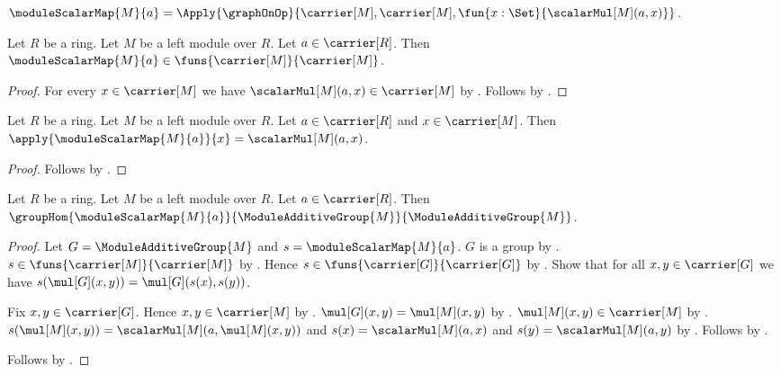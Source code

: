 \begin{definition}\label{module_scalar_map}
    $\moduleScalarMap{M}{a}
        =\Apply{\graphOnOp}{
            \carrier[M],\carrier[M],
            \fun{x:\Set}{\scalarMul[M](a,x)}}$.
\end{definition}

\begin{proposition}\label{module_scalar_map_type}
    Let $R$ be a ring.
    Let $M$ be a left module over $R$.
    Let $a\in\carrier[R]$.
    Then $\moduleScalarMap{M}{a}\in
        \funs{\carrier[M]}{\carrier[M]}$.
\end{proposition}
\begin{proof}
    For every $x\in\carrier[M]$ we have
        $\scalarMul[M](a,x)\in\carrier[M]$ by
        .
    Follows by .
\end{proof}

\begin{proposition}\label{module_scalar_map_apply}
    Let $R$ be a ring.
    Let $M$ be a left module over $R$.
    Let $a\in\carrier[R]$ and $x\in\carrier[M]$.
    Then $\apply{\moduleScalarMap{M}{a}}{x}=\scalarMul[M](a,x)$.
\end{proposition}
\begin{proof}
    Follows by .
\end{proof}

\begin{theorem}\label{module_scalar_map_group_hom}
    Let $R$ be a ring.
    Let $M$ be a left module over $R$.
    Let $a\in\carrier[R]$.
    Then $\groupHom{\moduleScalarMap{M}{a}}{
        \ModuleAdditiveGroup{M}}{\ModuleAdditiveGroup{M}}$.
\end{theorem}
\begin{proof}
    Let $G=\ModuleAdditiveGroup{M}$ and $s=\moduleScalarMap{M}{a}$.
    $G$ is a group by .
    $s\in\funs{\carrier[M]}{\carrier[M]}$ by
        .
    Hence $s\in\funs{\carrier[G]}{\carrier[G]}$ by
        .
    Show that for all $x,y\in\carrier[G]$ we have
        $s(\mul[G](x,y))=\mul[G](s(x),s(y))$.
    \begin{subproof}
        Fix $x,y\in\carrier[G]$.
        Hence $x,y\in\carrier[M]$ by
            .
        $\mul[G](x,y)=\mul[M](x,y)$ by
            .
        $\mul[M](x,y)\in\carrier[M]$ by
            .
        $s(\mul[M](x,y))=\scalarMul[M](a,\mul[M](x,y))$ and
            $s(x)=\scalarMul[M](a,x)$ and
            $s(y)=\scalarMul[M](a,y)$ by
            .
        Follows by
            .
    \end{subproof}
    Follows by .
\end{proof}


